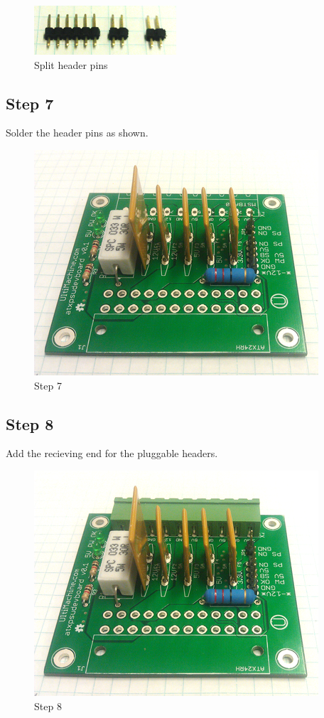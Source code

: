 \begin{figure}[H]
\centering
\includegraphics{./png/header-break.png}
\caption{Split header pins}
\end{figure}

\subsection{Step 7}

Solder the header pins as shown.

\begin{figure}[H]
\centering
\includegraphics{./png/step-07.png}
\caption{Step 7}
\end{figure}

\subsection{Step 8}

Add the recieving end for the pluggable headers.

\begin{figure}[H]
\centering
\includegraphics{./png/step-08.png}
\caption{Step 8}
\end{figure}

